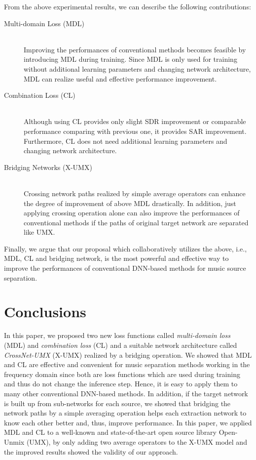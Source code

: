 \documentclass{article}
\begin{document}
From the above experimental results, we can describe the following contributions:
\begin{description}
   \item[Multi-domain Loss (MDL)]\mbox{}\\
        Improving the performances of conventional methods becomes feasible by introducing MDL during training.
        Since MDL is only used for training without additional learning parameters and changing network architecture, MDL can realize useful and effective performance improvement.
    \item[Combination Loss (CL)]\mbox{}\\
        Although using CL provides only slight SDR improvement or comparable performance comparing with previous one, it provides SAR improvement.
        Furthermore, CL does not need additional learning parameters and changing network architecture.
\item[Bridging Networks (X-UMX)]\mbox{}\\
		Crossing network paths realized by simple average operators can enhance the degree of improvement of above MDL drastically.
		In addition, just applying crossing operation alone can also improve the performances of conventional methods
if the paths of original target network are separated like UMX.
\end{description}
\noindent
Finally, we argue that our proposal which collaboratively utilizes the above, i.e., MDL, CL and bridging network, is the most powerful and effective way to improve the performances of conventional DNN-based methods for music source separation.
\fi

\vspace{-2mm}
\section{Conclusions}
\label{sec:concludions}
\vspace{-1mm}
In this paper, we proposed two new loss functions called \emph{multi-domain loss} (MDL) and \emph{combination loss} (CL) and a suitable network architecture called \emph{CrossNet-UMX} (X-UMX) realized by a bridging operation.
We showed that MDL and CL are effective and convenient for music separation methods working in the frequency domain since both are loss functions which are used during training and thus do not change the inference step.
Hence, it is easy to apply them to many other conventional DNN-based methods.
In addition, if the target network is built up from sub-networks for each source, we showed that bridging the network paths by a simple averaging operation helps each extraction network to know each other better and, thus, improve performance.
In this paper, we applied MDL and CL to a well-known and state-of-the-art open source library Open-Unmix (UMX), by only adding two average operators to the X-UMX model and the improved results showed the validity of our approach. 

\clearpage


\end{document}
